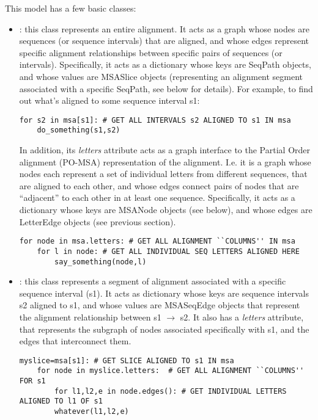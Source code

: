 \documentclass{howto}
\begin{document}
This model has a few basic classes:
\begin{itemize}
\item    
{}: this class represents an entire alignment.  It acts as a graph whose
nodes are sequences (or sequence intervals) that are aligned, and whose edges 
represent specific alignment relationships between specific pairs of sequences 
(or intervals).  Specifically, it acts as a dictionary whose keys are SeqPath
objects, and whose values are MSASlice objects (representing an alignment segment
associated with a specific SeqPath, see below for details).  For example, to find
out what's aligned to some sequence interval s1:
\begin{verbatim}
for s2 in msa[s1]: # GET ALL INTERVALS s2 ALIGNED TO s1 IN msa
    do_something(s1,s2)
\end{verbatim}

In addition, its {\em letters} attribute acts as a graph interface
to the Partial Order alignment (PO-MSA) representation of the alignment.  I.e.
it is a graph whose nodes each represent a set of individual letters from 
different sequences, that are aligned to each other, and whose edges connect
pairs of nodes that are ``adjacent'' to each other in at least one sequence.
Specifically, it acts as a dictionary whose keys are MSANode objects (see below),
and whose edges are LetterEdge objects (see previous section).
\begin{verbatim}
for node in msa.letters: # GET ALL ALIGNMENT ``COLUMNS'' IN msa
    for l in node: # GET ALL INDIVIDUAL SEQ LETTERS ALIGNED HERE
        say_something(node,l)
\end{verbatim}


\item    
{}: this class represents a segment of alignment associated with
a specific sequence interval (s1).  It acts as dictionary whose keys are sequence
intervals s2 aligned to s1, and whose values are MSASeqEdge objects
that represent the alignment relationship between s1 $\rightarrow$ s2.  It also 
has a {\em letters} attribute, that represents the subgraph of nodes
associated specifically with s1, and the edges that interconnect them.

\begin{verbatim}
myslice=msa[s1]: # GET SLICE ALIGNED TO s1 IN msa
    for node in myslice.letters:  # GET ALL ALIGNMENT ``COLUMNS'' FOR s1
        for l1,l2,e in node.edges(): # GET INDIVIDUAL LETTERS ALIGNED TO l1 OF s1
	    whatever(l1,l2,e)
\end{verbatim}


\end{itemize}
\end{document}
